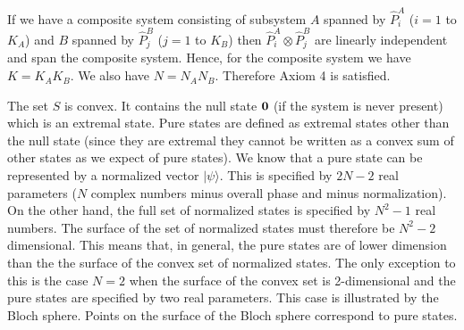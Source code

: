 \documentclass[10pt,twocolumn]{article}
\begin{document}
If we have a composite system consisting of subsystem $A$ spanned by
$\hat{P}^A_i$ ($i=1$ to $K_A$) and $B$ spanned by
$\hat{P}^B_j$ ($j=1$ to $K_B$) then
$\hat{P}_i^A\otimes\hat{P}^B_j$ are linearly independent and span the
composite system.  Hence, for the composite system we have $K=K_AK_B$.
We also have $N=N_AN_B$.  Therefore Axiom 4 is satisfied.

The set $S$ is convex. It contains the null state $\bf 0$ (if the system
is never present) which is an extremal state.  Pure states are
defined as extremal states other than the null state (since they are
extremal they cannot be written as a convex sum of other states as we
expect of pure states).  We know that a  pure state can be represented
by a normalized vector $|\psi\rangle$.  This is specified by $2N-2$ real
parameters ($N$ complex numbers minus overall phase and minus
normalization).  On the other hand, the full set of normalized states is
specified by $N^2-1$ real numbers.  The surface of the set of normalized
states must therefore be $N^2-2$ dimensional.  This means that, in
general, the pure states are of lower dimension than the the surface of
the convex set of normalized states.  The only exception to this is the
case $N=2$ when the surface of the convex set is 2-dimensional and the
pure states are specified by two real parameters.  This case is
illustrated by the Bloch sphere. Points on the surface of the Bloch
sphere correspond to pure states.
\end{document}
